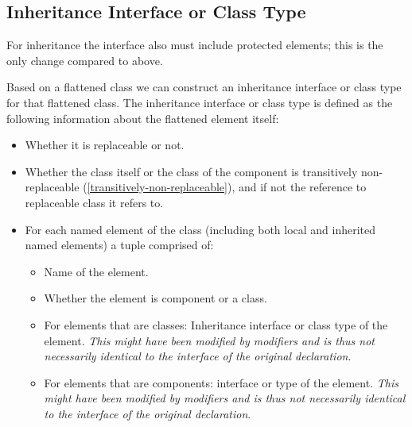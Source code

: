 \documentclass[10pt,a4paper]{report}
\def\doublelabel#1{\label{#1}\hypertarget{#1}{}}
\begin{document}
\subsection{Inheritance Interface or Class Type}\doublelabel{inheritance-interface-or-class-type}

For inheritance the interface also must include protected elements; this
is the only change compared to above.

Based on a flattened class we can construct an inheritance interface or
class type for that flattened class. The inheritance interface or class
type is defined as the following information about the flattened element
itself:

\begin{itemize}
\item
  Whether it is replaceable or not.
\item
  Whether the class itself or the class of the component is transitively
  non-replaceable (\ref{transitively-non-replaceable}), and if not the reference to
  replaceable class it refers to.
\item
  For each named element of the class (including both local and
  inherited named elements) a tuple comprised of:

  \begin{itemize}
  \item
    Name of the element.
  \item
    Whether the element is component or a class.
  \item
    For elements that are classes: Inheritance interface or class type
    of the element. \emph{This might have been modified by modifiers and
    is thus not necessarily identical to the interface of the original
    declaration}.
  \item
    For elements that are components: interface or type of the element.
    \emph{This might have been modified by modifiers and is thus not
    necessarily identical to the interface of the original declaration}.
  \end{itemize}
\end{itemize}
\end{document}
